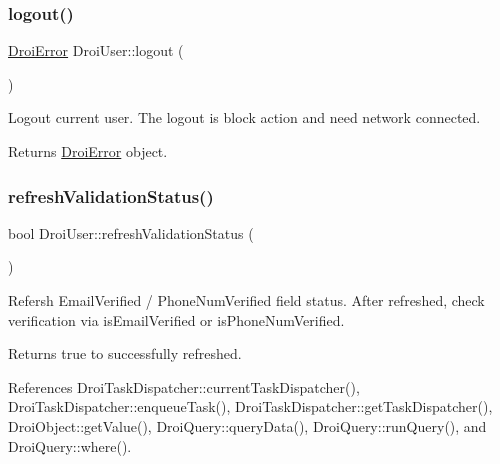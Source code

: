 \subsubsection{\texorpdfstring{logout()}{logout()}}
{\footnotesize\ttfamily \hyperlink{class_droi_error}{Droi\+Error} Droi\+User\+::logout (\begin{DoxyParamCaption}{ }\end{DoxyParamCaption})}

Logout current user. The logout is block action and need network connected. \begin{DoxyReturn}{Returns}
\hyperlink{class_droi_error}{Droi\+Error} object. 
\end{DoxyReturn}
\mbox{\label{class_droi_user_ae0b35cc0d9e35a415ce203d909857861}} 
\subsubsection{\texorpdfstring{refresh\+Validation\+Status()}{refreshValidationStatus()}}
{\footnotesize\ttfamily bool Droi\+User\+::refresh\+Validation\+Status (\begin{DoxyParamCaption}{ }\end{DoxyParamCaption})}

Refersh Email\+Verified / Phone\+Num\+Verified field status. After refreshed, check verification via is\+Email\+Verified or is\+Phone\+Num\+Verified.

\begin{DoxyReturn}{Returns}
true to successfully refreshed. 
\end{DoxyReturn}


References Droi\+Task\+Dispatcher\+::current\+Task\+Dispatcher(), Droi\+Task\+Dispatcher\+::enqueue\+Task(), Droi\+Task\+Dispatcher\+::get\+Task\+Dispatcher(), Droi\+Object\+::get\+Value(), Droi\+Query\+::query\+Data(), Droi\+Query\+::run\+Query(), and Droi\+Query\+::where().

\mbox{\label{class_droi_user_a54b508fdf1684d5f143b7fa1884dc03c}} 
